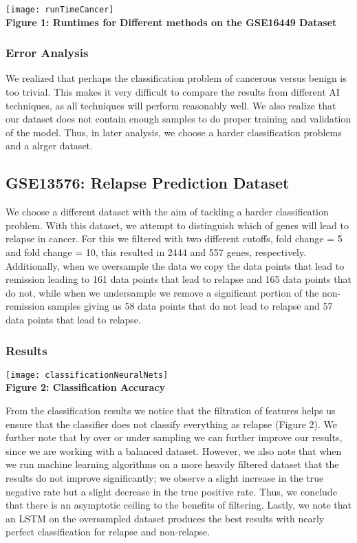 \documentclass[12pt]{scrartcl}
\begin{document}
    \begin{center}
    \texttt{[image: runTimeCancer]}\\
    \textbf{Figure 1: Runtimes for Different methods on the GSE16449 Dataset}
    \end{center}
    
    \subsubsection{Error Analysis}
    We realized that perhaps the classification problem of cancerous versus benign is too trivial. This makes it very difficult to compare the results from different AI techniques, as all techniques will perform reasonably well. We also realize that our dataset does not contain enough samples to do proper training and validation of the model. Thus, in later analysis, we choose a harder classification problems and a alrger dataset.
    
    \subsection{GSE13576: Relapse Prediction Dataset}
    We choose a different dataset with the aim of tackling a harder classification problem. With this dataset, we attempt to distinguish which of genes will lead to relapse in cancer. For this we filtered with two different cutoffs, fold change = 5 and fold change = 10, this resulted in 2444 and 557 genes, respectively. Additionally, when we oversample the data we copy the data points that lead to remission leading to 161 data points that lead to relapse and 165 data points that do not, while when we undersample we remove a significant portion of the non-remission samples giving us 58 data points that do not lead to relapse and 57 data points that lead to relapse. 
    
    \subsubsection{Results}    
    \begin{center}
    \texttt{[image: classificationNeuralNets]}\\
    \textbf{Figure 2: Classification Accuracy}
    \end{center}
   
    From the classification results we notice that the filtration of features helps us ensure that the classifier does not classify everything as relapse (Figure 2). We further note that by over or under sampling we can further improve our results, since we are working with a balanced dataset. However, we also note that when we run machine learning algorithms on a more heavily filtered dataset that the results do not improve significantly; we observe a slight increase in the true negative rate but a slight decrease in the true positive rate. Thus, we conclude that there is an asymptotic ceiling to the benefits of filtering. Lastly, we note that an LSTM on the oversampled dataset produces the best results with nearly perfect classification for relapse and non-relapse. 
    
\end{document}
